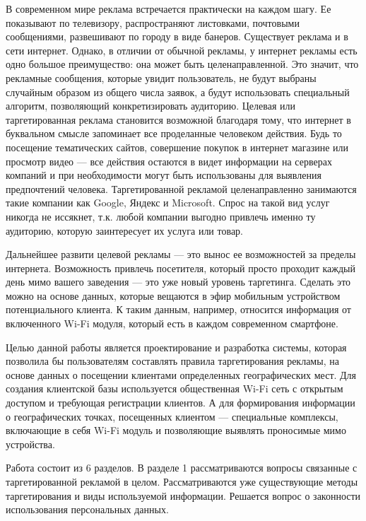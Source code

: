 \intro

В современном мире реклама встречается практически на каждом шагу. Ее показывают по телевизору, распространяют листовками, почтовыми сообщениями, развешивают по городу в виде банеров. Существует реклама и в сети интернет. Однако, в отличии от обычной рекламы, у интернет рекламы есть одно большое преимущество: она может быть целенаправленной. Это значит, что рекламные сообщения, которые увидит пользователь, не будут выбраны случайным образом из общего числа заявок, а будут использовать специальный алгоритм, позволяющий конкретизировать аудиторию. Целевая или таргетированная реклама становится возможной благодаря тому, что интернет в буквальном смысле запоминает все проделанные человеком действия. Будь то посещение тематических сайтов, совершение покупок в интернет магазине или просмотр видео --- все действия остаются в видет информации на серверах компаний и при необходимости могут быть использованы для выявления предпочтений человека. Таргетированной рекламой целенаправленно занимаются такие компании как Google, Яндекс и Microsoft. Спрос на такой вид услуг никогда не иссякнет, т.к. любой компании выгодно привлечь именно ту аудиторию, которую заинтересует их услуга или товар.

Дальнейшее развити целевой рекламы --- это вынос ее возможностей за пределы интернета. Возможность привлечь посетителя, который просто проходит каждый день мимо вашего заведения --- это уже новый уровень таргетинга. Сделать это можно на основе данных, которые вещаются в эфир мобильным устройством потенциального клиента. К таким данным, например, относится информация от включенного Wi-Fi модуля, который есть в каждом современном смартфоне. 

Целью данной работы является проектирование и разработка системы, которая позволила бы пользователям составлять правила таргетирования рекламы, на основе данных о посещении клиентами определенных географических мест. Для создания клиентской базы используется общественная Wi-Fi сеть с открытым доступом и требующая регистрации клиентов. А для формирования информации о географических точках, посещенных клиентом --- специальные комплексы, включающие в себя Wi-Fi модуль и позволяющие выявлять проносимые мимо устройства.

Работа состоит из 6 разделов. В разделе 1 рассматриваются вопросы связанные с таргетированной рекламой в целом. Рассматриваются уже существующие методы таргетирования и виды используемой информации. Решается вопрос о законности использования персональных данных.

